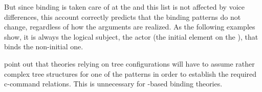 \documentclass[output=paper,biblatex,babelshorthands,newtxmath,draftmode,colorlinks,citecolor=brown]{langscibook}
\begin{document}
But since binding is taken care of at the \argstl and this list is not affected by voice
differences, this account correctly predicts that the binding patterns do not change, 
regardless of how the arguments are realized. 
As the following examples show, it is always the logical subject, the
actor (the initial element on the \argstl), that binds the non-initial one.
\eal
{}
\zl
\eal
{}
\zl

\citet[]{MS98a} point out that theories relying on tree configurations will have to assume
rather complex tree structures for one of the patterns in order to establish the required c-command
relations. This is unnecessary for \argst-based binding theories.
\end{document}
